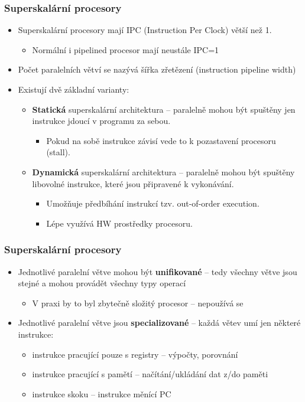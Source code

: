 \documentclass{beamer}
\begin{document}
\begin{frame}
\frametitle{Superskalární procesory}

\begin{itemize}
\item Superskalární procesory mají IPC (Instruction Per Clock) větší než 1. 
  \begin{itemize}
  \item Normální i pipelined procesor mají neustále IPC=1
  \end{itemize}
\item Počet paralelních větví se nazývá šířka zřetězení (instruction pipeline width)
\item Existují dvě základní varianty:
  \begin{itemize}
  \item \textbf{Statická} superskalární architektura -- paralelně mohou být spuštěny jen instrukce jdoucí v programu za sebou.
    \begin{itemize}
    \item Pokud na sobě instrukce závisí vede to k pozastavení procesoru (stall).
    \end{itemize}
  \item \textbf{Dynamická} superskalární architektura -- paralelně mohou být spuštěny libovolné instrukce, které jsou připravené k vykonávání.
    \begin{itemize}
    \item Umožňuje předbíhání instrukcí tzv. out-of-order execution.
    \item Lépe využívá HW prostředky procesoru.
    \end{itemize}
  \end{itemize}
\end{itemize}

\end{frame}

\begin{frame}
\frametitle{Superskalární procesory}

\begin{itemize}
\item Jednotlivé paralelní větve mohou být \textbf{unifikované} -- tedy všechny větve jsou stejné a mohou provádět všechny typy operací
  \begin{itemize}
  \item V praxi by to byl zbytečně složitý procesor -- nepoužívá se
  \end{itemize}
\item Jednotlivé paralelní větve jsou \textbf{specializované} -- každá větev umí jen některé instrukce:
  \begin{itemize}
  \item instrukce pracující pouze s registry -- výpočty, porovnání
  \item instrukce pracující s pamětí -- načítání/ukládání dat z/do paměti
  \item instrukce skoku -- instrukce měnící PC
  \end{itemize}
\end{itemize}
\end{frame}
\end{document}
